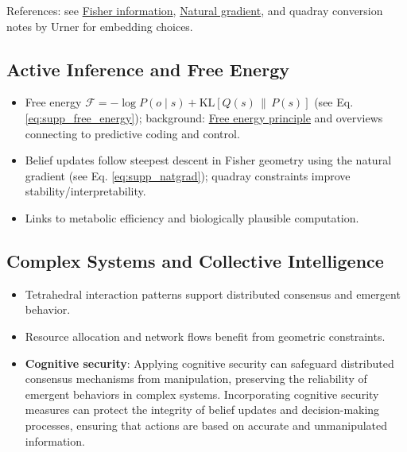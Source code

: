 \documentclass[
  10pt,
]{article}
\providecommand{\tightlist}{%
  \setlength{\itemsep}{0pt}\setlength{\parskip}{0pt}}
\begin{document}
References: see
\href{https://en.wikipedia.org/wiki/Fisher_information}{Fisher
information},
\href{https://en.wikipedia.org/wiki/Natural_gradient}{Natural gradient},
and quadray conversion notes by Urner for embedding choices.

\hypertarget{active-inference-and-free-energy}{%
\subsection{Active Inference and Free
Energy}\label{active-inference-and-free-energy}}

\begin{itemize}
\tightlist
\item
  Free energy
  \(\mathcal{F} = -\log P(o\mid s) + \mathrm{KL}[Q(s)\,\|\,P(s)]\) (see
  Eq. \eqref{eq:supp_free_energy}); background:
  \href{https://en.wikipedia.org/wiki/Free_energy_principle}{Free energy
  principle} and overviews connecting to predictive coding and control.
\item
  Belief updates follow steepest descent in Fisher geometry using the
  natural gradient (see Eq. \eqref{eq:supp_natgrad}); quadray
  constraints improve stability/interpretability.
\item
  Links to metabolic efficiency and biologically plausible computation.
\end{itemize}

\hypertarget{complex-systems-and-collective-intelligence}{%
\subsection{Complex Systems and Collective
Intelligence}\label{complex-systems-and-collective-intelligence}}

\begin{itemize}
\tightlist
\item
  Tetrahedral interaction patterns support distributed consensus and
  emergent behavior.
\item
  Resource allocation and network flows benefit from geometric
  constraints.
\item
  \textbf{Cognitive security}: Applying cognitive security can safeguard
  distributed consensus mechanisms from manipulation, preserving the
  reliability of emergent behaviors in complex systems. Incorporating
  cognitive security measures can protect the integrity of belief
  updates and decision-making processes, ensuring that actions are based
  on accurate and unmanipulated information.
\end{itemize}
\end{document}
